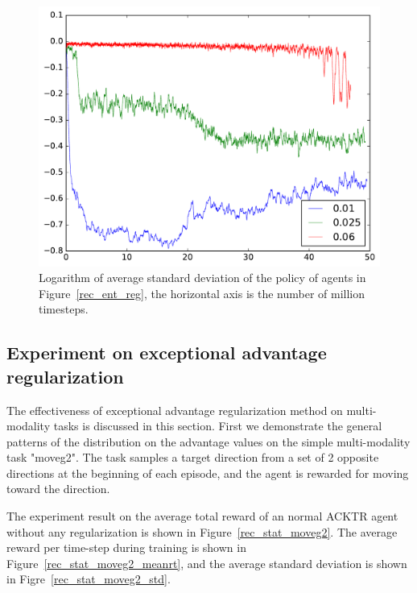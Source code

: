 \begin{figure}[!htbp]
	\includegraphics[width=\textwidth]{images/rec_std_ent_reg.pdf}
	\centering
	\caption{Logarithm of average standard deviation of the policy of agents in Figure~\ref{rec_ent_reg}, the horizontal axis is the number of million timesteps.}\label{rec_std_ent_reg}
\end{figure}

\subsection{Experiment on exceptional advantage regularization}
The effectiveness of exceptional advantage regularization method on multi-modality tasks is discussed in this section.
First we demonstrate the general patterns of the distribution on the advantage values on the simple multi-modality task "moveg2". The task samples a target direction from a set of 2 opposite directions at the beginning of each episode, and the agent is rewarded for moving toward the direction.

The experiment result on the average total reward of an normal ACKTR agent without any regularization is shown in Figure~\ref{rec_stat_moveg2}. The average reward per time-step during training is shown in Figure~\ref{rec_stat_moveg2_meanrt}, and the average standard deviation is shown in Figre~\ref{rec_stat_moveg2_std}.


